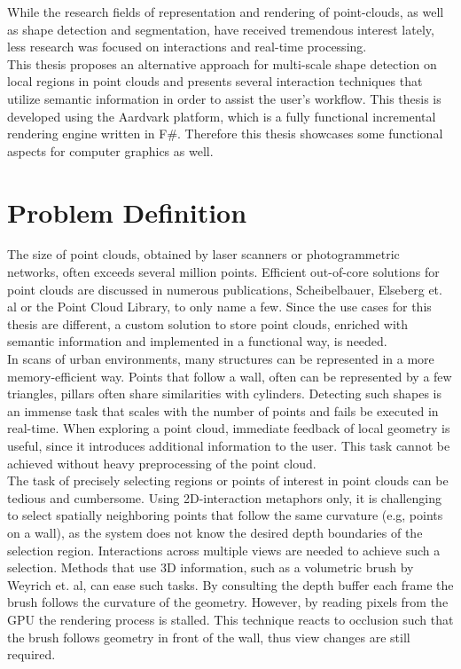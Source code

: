 While the research fields of representation and rendering of point-clouds, as well as shape detection and segmentation,  have received tremendous interest lately, less research was focused on interactions and real-time processing. 
\\
This thesis proposes an alternative approach for multi-scale shape detection on local regions in point clouds and presents several interaction techniques that utilize semantic information in order to assist the user's workflow. This thesis is developed using the Aardvark platform, which is a fully functional incremental rendering engine written in F\#. Therefore this thesis showcases some functional aspects for computer graphics as well. 

\section{Problem Definition}

The size of point clouds, obtained by laser scanners or photogrammetric networks, often exceeds several million points. 
Efficient out-of-core solutions for point clouds are discussed in numerous publications, Scheibelbauer\cite{scheiblauer-thesis}, Elseberg et. al\cite{elseberg2013one} or the Point Cloud Library\cite{rusu20113d}, to only name a few. Since the use cases for this thesis are different, a custom solution to store point clouds, enriched with semantic information and implemented in a functional way, is needed. 
\\
In scans of urban environments, many structures can be represented in a more memory-efficient way. Points that follow a wall, often can be represented by a few triangles, pillars often share similarities with cylinders. Detecting such shapes is an immense task that scales with the number of points and fails be executed in real-time. When exploring a point cloud, immediate feedback of local geometry is useful, since it introduces additional information to the user. This task cannot be achieved without heavy preprocessing of the point cloud. 
\\
The task of precisely selecting regions or points of interest in point clouds can be tedious and cumbersome. Using 2D-interaction metaphors only, it is challenging to
select spatially neighboring points that follow the same curvature (e.g, points on a wall), as the system does not know the desired depth boundaries of the selection region. Interactions across multiple views are needed to achieve such a selection.  Methods that use 3D information, such as a volumetric brush by Weyrich et. al\cite{weyrich2004post}, can ease such tasks. By consulting the depth buffer each frame the brush follows the curvature of the geometry. However, by reading pixels from the GPU the rendering process is stalled. This technique reacts to occlusion such that the brush follows geometry in front of the wall, thus view changes are still required.


